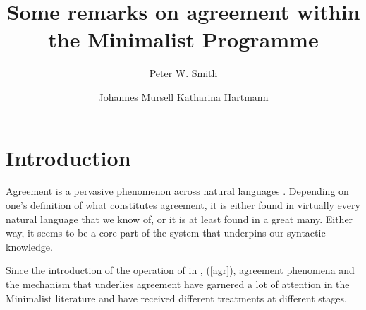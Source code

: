 \documentclass[output=paper
,modfonts
,nonflat]{langsci/langscibook}
\title{Some remarks on agreement within the Minimalist Programme}
\author{%
 Peter W. Smith\affiliation{Goethe-University Frankfurt}\and 
 Johannes Mursell\affiliation{Goethe-University Frankfurt}\lastand 
 Katharina Hartmann\affiliation{Goethe-University Frankfurt}
}
\begin{document}
\maketitle
\section{Introduction}
\label{secintro}

Agreement is a pervasive phenomenon across natural languages \citep{corbett2006}. Depending on one's definition of what constitutes agreement, it is either found in virtually every natural language that we know of, or it is at least found in a great many. Either way, it seems to be a core part of the system that underpins our syntactic knowledge.

Since the introduction of the operation of \agr{} in \citet{Chomsky2000}, (\ref{agr}), agreement phenomena and the mechanism that underlies agreement have garnered a lot of attention in the Minimalist literature and have received different treatments at different stages.
\end{document}
